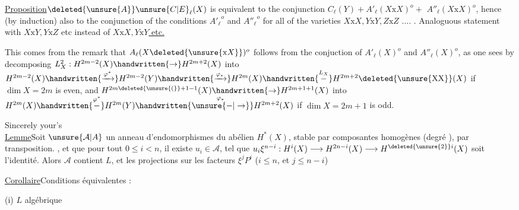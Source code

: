 \uline{Proposition}\quad $\deleted{\unsure{A}}\unsure{C|E}_{\ell}(X)$ is equivalent to the conjunction $C_{\ell}(Y)+A'_{\ell}(X\mathbin{\mathrm{x}}X)^{o}+{}$
$A''_{\ell}(X\mathbin{\mathrm{x}}X)^{o}$, hence (by induction) also to the conjunction of the
conditions $ {A'_{\ell}}^{o}$ and $ {A''_{\ell}}^{o}$ for all of the varieties $X\mathbin{\mathrm{x}}X,Y\mathbin{\mathrm{x}}Y,Z\mathbin{\mathrm{x}}Z$ .... . Analoguous statement with $X\mathbin{\mathrm{x}}Y,Y\mathbin{\mathrm{x}}Z$ etc instead of \uline{$X\mathbin{\mathrm{x}}X,Y\mathbin{\mathrm{x}}Y$ etc.}

This comes from the remark that  $A_{\ell}(X\deleted{\unsure{\mathbin{\mathrm{x}}X}})^{o}$ follows from the conjuction of
$A'_{\ell}(X)^{o}$ and $A''_{\ell}(X)^{o}$, as one sees by decomposing $L_{X}^{2}:H^{2m-2}(X)\handwritten{\to}H^{2m+2}(X)$
into $H^{2m-2}(X)\handwritten{\xrightarrow{\varphi^{*}}}H^{2m-2}(Y)\handwritten{\xrightarrow{\varphi_{*}}}H^{2m}(X)\handwritten{\overset{L_{X}}{-}}H^{2m+2}\deleted{\unsure{\mathrm{XX}}}(X)$ if $\dim X=2m$ is even,
and $H^{2m\deleted{\unsure{(}}+1-1}(X)\handwritten{\to}H^{2m+1+1}(X)$ into $H^{2m}(X)\handwritten{\overset{\varphi^{*}}{-}}H^{2m}(Y)\handwritten{\overset{\varphi_{*}}{\unsure{-|\to}}}H^{2m+2}(X)$ if
$\dim X=2m+1$ is odd.

Sincerely your's\\

\uline{Lemme}\quad Soit $\unsure{\mathcal{A}|A}$ un anneau d'endomorphismes
du  abélien $H^{*}(X)$, stable par composantes homogènes
(degré ), par transposition.  , et que pour
tout $0\leq i<n$, il existe $u_i\in\mathcal{A}$,  tel que
$u_i\xi^{n-i}:H^i(X)\longrightarrow H^{2n-i}(X)\longrightarrow H^{\deleted{\unsure{2}}i}(X)$ soit l'identité.
Alors $\mathcal{A}$ contient $L$,  et les projections
sur les facteurs  $\xi^j P^i$ ($i\leq n$, et
 $j\leq n-i$)

\uline{Corollaire}\quad Conditions équivalentes :

(i) $L$ algébrique

